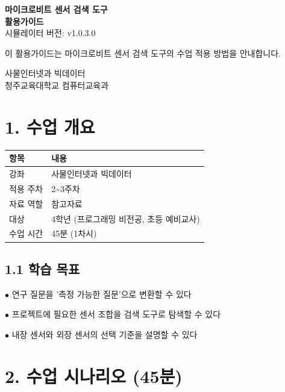 \documentclass[11pt,a4paper]{article}
\begin{document}
\begin{titlepage}
\centering
\vspace*{3cm}
{\Huge\bfseries\color{primary} 마이크로비트 센서 검색 도구}\\[0.5cm]
{\Huge\bfseries\color{primary} 활용가이드}
\\[1.5cm]
{\Large 시뮬레이터 버전: v1.0.3.0}
\\[2cm]
\begin{tcolorbox}[summarybox]
\centering
{\large 이 활용가이드는 마이크로비트 센서 검색 도구의 수업 적용 방법을 안내합니다.}
\end{tcolorbox}
\vfill
{\large 사물인터넷과 빅데이터}\\[0.3cm]
{\large 청주교육대학교 컴퓨터교육과}
\vspace{1cm}
\end{titlepage}

\section*{1. 수업 개요}

\begin{center}
\renewcommand{\arraystretch}{1.4}
\begin{tabular}{|p{2.8cm}|p{12.2cm}|}
\hline
\rowcolor{tableheader}
\textbf{항목} & \textbf{내용} \\
\hline
강좌 & 사물인터넷과 빅데이터 \\
\hline
적용 주차 & 2\textasciitilde{}3주차 \\
\hline
자료 역할 & 참고자료 \\
\hline
대상 & 4학년 (프로그래밍 비전공, 초등 예비교사) \\
\hline
수업 시간 & 45분 (1차시) \\
\hline
\end{tabular}
\end{center}

\subsection*{1.1 학습 목표}

$\bullet$ 연구 질문을 '측정 가능한 질문'으로 변환할 수 있다

$\bullet$ 프로젝트에 필요한 센서 조합을 검색 도구로 탐색할 수 있다

$\bullet$ 내장 센서와 외장 센서의 선택 기준을 설명할 수 있다



\section*{2. 수업 시나리오 (45분)}
\end{document}
